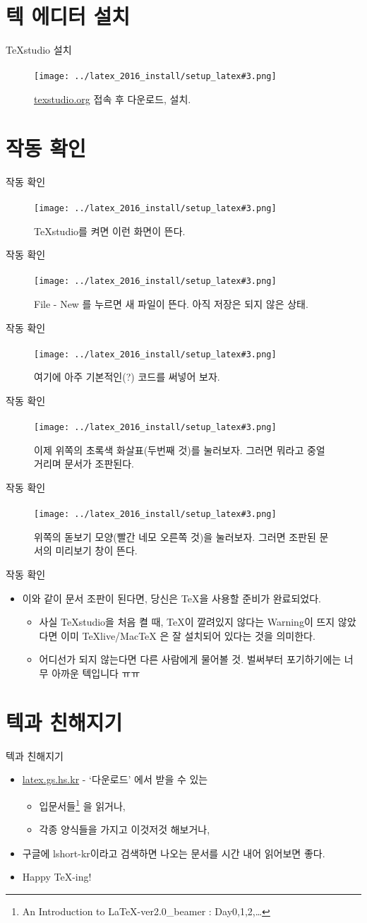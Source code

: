 \documentclass[12pt]{beamer}
\newcommand{\SetupImageSlideShow}[5]{
	\begin{frame}{#1}
		\framesubtitle{#2}
		\begin{figure}
			\centering
			\texttt{[image: ../latex\_2016\_install/setup\_latex\#3.png]}
			\caption{#4}
		\end{figure}
	\end{frame}
}
\begin{document}
\section{텍 에디터 설치}
\SetupImageSlideShow{TeXstudio 설치}{}{59}{\url{texstudio.org} 접속 후 다운로드, 설치.}{}

\section{작동 확인}

\SetupImageSlideShow{작동 확인}{}{60}{TeXstudio를 켜면 이런 화면이 뜬다.}{}
\SetupImageSlideShow{작동 확인}{}{61}{File - New 를 누르면 새 파일이 뜬다. 아직 저장은 되지 않은 상태.}{}
\SetupImageSlideShow{작동 확인}{}{62}{여기에 아주 기본적인(?) 코드를 써넣어 보자.}{}
\SetupImageSlideShow{작동 확인}{}{64}{이제 위쪽의 초록색 화살표(두번째 것)를 눌러보자. 그러면 뭐라고 중얼거리며 문서가 조판된다.}{}
\SetupImageSlideShow{작동 확인}{}{65}{위쪽의 돋보기 모양(빨간 네모 오른쪽 것)을 눌러보자. 그러면 조판된 문서의 미리보기 창이 뜬다.}{}

\begin{frame}{작동 확인}
	\begin{itemize}
		\item 이와 같이 문서 조판이 된다면, 당신은 \TeX 을 사용할 준비가 완료되었다.
		\begin{itemize}
			\item 사실 TeXstudio을 처음 켤 때, TeX이 깔려있지 않다는 Warning이 뜨지 않았다면 이미 TeXlive/MacTeX 은 잘 설치되어 있다는 것을 의미한다.
			\item 어디선가 되지 않는다면 다른 사람에게 물어볼 것. 벌써부터 포기하기에는 너무 아까운 텍입니다 ㅠㅠ
		\end{itemize}
	\end{itemize}
\end{frame}

\section{텍과 친해지기}
\begin{frame}{텍과 친해지기}
	\begin{itemize}
		\item \url{latex.gs.hs.kr} - `다운로드' 에서 받을 수 있는
		\begin{itemize}
			\item 입문서들\footnote{An Introduction to LaTeX-ver2.0\_beamer : Day0,1,2,\ldots} 을 읽거나,
			\item 각종 양식들을 가지고 이것저것 해보거나,
		\end{itemize}
		\item 구글에 lshort-kr이라고 검색하면 나오는 문서를 시간 내어 읽어보면 좋다.
		\item Happy \TeX-ing!
	\end{itemize}
\end{frame}
\end{document}
